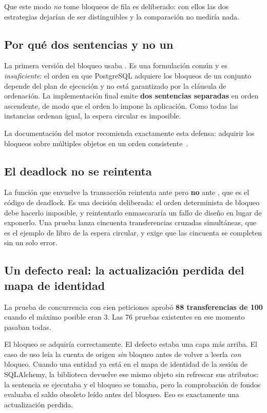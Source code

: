 Que este modo \emph{no} tome bloqueos de fila es deliberado: con ellos las dos
estrategias dejarían de ser distinguibles y la comparación no mediría nada.

\subsection{Por qué dos sentencias y no un }

La primera versión del bloqueo usaba
. Es una formulación común
y es \emph{insuficiente}: el orden en que PostgreSQL adquiere los bloqueos de
un conjunto depende del plan de ejecución y no está garantizado por la
cláusula de ordenación. La implementación final emite \textbf{dos sentencias
separadas} en orden ascendente, de modo que el orden lo impone la aplicación.
Como todas las instancias ordenan igual, la espera circular es imposible.

La documentación del motor recomienda exactamente esta defensa: adquirir los
bloqueos sobre múltiples objetos en un orden consistente~\cite{pg16lock}.

\subsection{El deadlock no se reintenta}

La función que envuelve la transacción reintenta ante  pero
\textbf{no} ante , que es el código de deadlock. Es una
decisión deliberada: el orden determinista de bloqueo debe hacerlo imposible,
y reintentarlo enmascararía un fallo de diseño en lugar de exponerlo. Una
prueba lanza cincuenta transferencias cruzadas simultáneas, que es el ejemplo
de libro de la espera circular, y exige que las cincuenta se completen sin un
solo error. 

\subsection{Un defecto real: la actualización perdida del mapa de identidad}

\label{subsec:lostupdate}
La prueba de concurrencia con cien peticiones aprobó \textbf{88 transferencias
de 100} cuando el máximo posible eran 3. Las 76 pruebas existentes en ese
momento pasaban todas.

El bloqueo se adquiría correctamente. El defecto estaba una capa más arriba.
El caso de uso leía la cuenta de origen \emph{sin} bloqueo antes de volver a
leerla \emph{con} bloqueo. Cuando una entidad ya está en el mapa de identidad
de la sesión de SQLAlchemy, la biblioteca devuelve ese mismo objeto sin
refrescar sus atributos: la sentencia  se ejecutaba y el
bloqueo se tomaba, pero la comprobación de fondos evaluaba el saldo obsoleto
leído antes del bloqueo. Eso es exactamente una actualización perdida.

